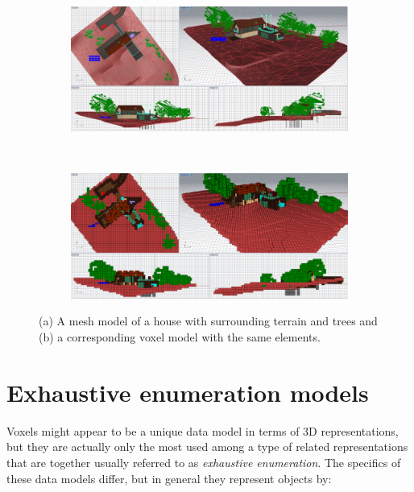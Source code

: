 \begin{figure}
\centering
\begin{subfigure}[b]{\linewidth}
\includegraphics[width=\linewidth]{figs/model-pre}
\caption{}%
\label{subfig:model-pre}
\end{subfigure}
\\
\begin{subfigure}[b]{\linewidth}
\includegraphics[width=\linewidth]{figs/model-post}
\caption{}%
\label{subfig:model-post}
\end{subfigure}
\caption{(a) A mesh model of a house with surrounding terrain and trees and (b) a corresponding voxel model with the same elements.}%
\label{fig:model}
\end{figure}

\section{Exhaustive enumeration models}

Voxels might appear to be a unique data model in terms of 3D representations, but they are actually only the most used among a type of related representations that are together usually referred to as \emph{exhaustive enumeration}.
The specifics of these data models differ, but in general they represent objects by:

